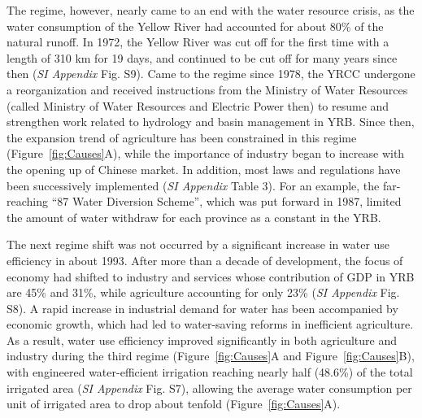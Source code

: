 \documentclass[9pt, twocolumn, twoside, lineno]{pnas-new}
\begin{document}
The regime, however, nearly came to an end with the water resource crisis, as the water consumption of the Yellow River had accounted for about 80\% of the natural runoff. In 1972, the Yellow River was cut off for the first time with a length of 310 km for 19 days, and continued to be cut off for many years since then (\textit{SI Appendix} Fig. S9). 
Came to the regime since 1978, the YRCC undergone a reorganization and received instructions from the Ministry of Water Resources (called Ministry of Water Resources and Electric Power then) to resume and strengthen work related to hydrology and basin management in YRB.
Since then, the expansion trend of agriculture has been constrained in this regime (Figure~\ref{fig:Causes}A), while the importance of industry began to increase with the opening up of Chinese market. In addition, most laws and regulations have been successively implemented (\textit{SI Appendix} Table 3). For an example, the far-reaching “87 Water Diversion Scheme”, which was put forward in 1987, limited the amount of water withdraw for each province as a constant in the YRB.

The next regime shift was not occurred by a significant increase in water use efficiency in about 1993. 
After more than a decade of development, the focus of economy had shifted to industry and services whose contribution of GDP in YRB are 45\% and 31\%, while agriculture accounting for only 23\% (\textit{SI Appendix} Fig. S8).
A rapid increase in industrial demand for water has been accompanied by economic growth, which had led to water-saving reforms in inefficient agriculture. As a result, water use efficiency improved significantly in both agriculture and industry during the third regime (Figure~\ref{fig:Causes}A and Figure~\ref{fig:Causes}B), with engineered water-efficient irrigation reaching nearly half (48.6\%) of the total irrigated area (\textit{SI Appendix} Fig. S7), allowing the average water consumption per unit of irrigated area to drop about tenfold (Figure~\ref{fig:Causes}A).
\end{document}
